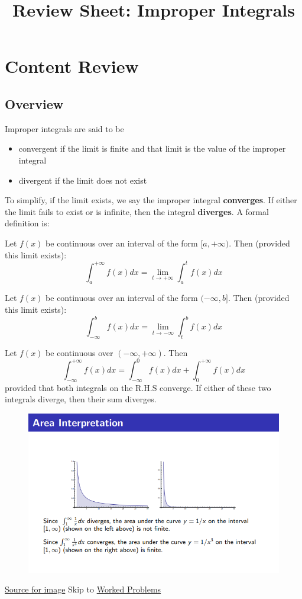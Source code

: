 \documentclass{article}
\title{Review Sheet: Improper Integrals}
\date{}
\author{}
\begin{document}
\maketitle
\vspace{-0.75in}
\section*{Content Review}
\subsection*{Overview}

Improper integrals are said to be 
\begin{itemize}
    \item convergent if the limit is finite and that limit is the value of the improper integral
    \item divergent if the limit does not exist
\end{itemize}

\noindent To simplify, if the limit exists, we say the improper integral \textbf{converges}. If either the limit fails to exist or is infinite, then the integral \textbf{diverges}.
\vspace{0.05in}
\newline\noindent A formal definition is:

Let $f(x)$  be continuous over an interval of the form $[a, +\infty)$. Then (provided this limit exists):
$$\int_a^{+\infty}{f(x)}dx = \lim_{t \rightarrow +\infty}{\int_a^t{f(x)}dx}$$

Let $f(x)$ be continuous over an interval of the form $(-\infty, b]$. Then (provided this limit exists):
$$\int_{-\infty}^{b}{f(x)}dx = \lim_{t \rightarrow -\infty}{\int_t^b{f(x)}dx}$$

Let $f(x)$ be continuous over $(-\infty, +\infty)$. Then
$$\int_{-\infty}^{+\infty}{f(x)}dx = \int_{-\infty}^0{f(x)}dx + \int_0^{+\infty}{f(x)}dx$$ provided that both integrals on the R.H.S converge. If either of these two integrals diverge, then their sum diverges.

\begin{figure}[H]
    \centering
    \includegraphics[width=0.7\linewidth]{Src1.png}
    \label{fig:Src1}
\end{figure}
\noindent\href{https://www3.nd.edu/~apilking/Math10560/Lectures/Lecture%2015.pdf}{Source for image}
\newline Skip to \hyperlink{WorkedProblems}{Worked Problems}
\end{document}
